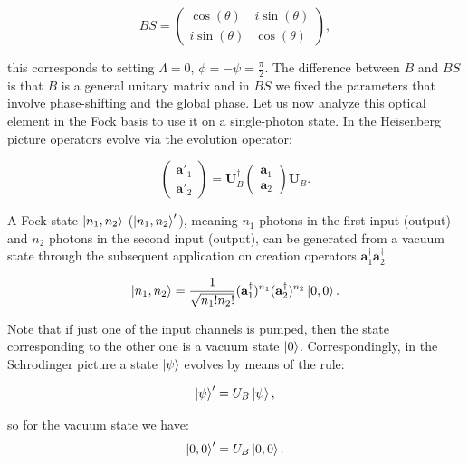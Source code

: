 \documentclass[12pt]{book}
\begin{document}
\begin{equation}
BS=\begin{pmatrix} \cos(\theta) & i \sin(\theta) \\ i \sin(\theta) & \cos(\theta) \end{pmatrix},\label{BS_matrix}
\end{equation}


this corresponds to  setting $\Lambda=0$, $\phi=-\psi=\frac{\pi}{2}$. The difference between $B$ and $BS$ is that $B$ is a general unitary matrix and in $BS$ we fixed the parameters that involve phase-shifting and the global phase. Let us now analyze this optical element in the Fock basis  to use it on a single-photon state. In the Heisenberg picture operators evolve via the evolution operator:

\begin{equation}
\begin{pmatrix} \mathbf{a}'_{1} \\ \mathbf{a}'_{2}\end{pmatrix}=\mathbf{U}^{\dagger}_{B} \begin{pmatrix} \mathbf{a}_{1} \\ \mathbf{a}_{2}\end{pmatrix} \mathbf{U}_{B}.
\label{Heisenberg}
\end{equation}

A Fock state $\ket{n_{1},n_{2}}$ ($\ket{n_{1},n_{2}}'$), meaning $n_{1}$ photons in the first input (output) and $n_{2}$ photons in the second input (output), can be generated from a vacuum state through the subsequent application on creation operators  $\mathbf{a}^{\dagger}_{1}\mathbf{a}^{\dagger}_{2}$. 

\begin{equation}
 \ket{n_{1},n_{2}}=\frac{1}{\sqrt{n_{1}! n_{2}!}} (\mathbf{a}_{1}^{\dagger})^{n_{1}}(\mathbf{a}_{2}^{\dagger})^{n_{2}} \ket{0,0}.
\end{equation}

Note that if just one of the input channels is pumped, then the state corresponding to the other one is a vacuum state $\ket{0}$. Correspondingly, in the Schrodinger picture a state $\ket{\psi}$ evolves by means of the rule:

\begin{equation}
 \ket{\psi}'=U_{B}\ket{\psi},
\end{equation}

so for the vacuum state we have:
\begin{equation}
 \ket{0,0}'=U_{B}\ket{0,0}.
 \label{evolution}
\end{equation}
\end{document}
